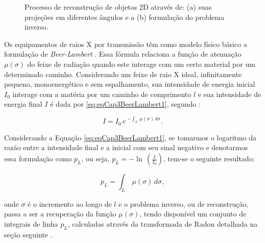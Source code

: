 
\begin{figure}[H]
	\centering
	
	\caption{Processo de reconstrução de objetos \acs{2D} através de: (a) suas projeções em diferentes ângulos e a (b) formulação do problema inverso.}
	
	\hfill
	
	\label{fig:imgCap3ProbInver}
\end{figure}

Os equipamentos de raios X por transmissão têm como modelo físico básico a formulação de \textit{Beer-Lambert} \cite{zeng2010medical}. Essa fórmula relaciona a função de atenuação $\mu(\sigma)$ do feixe de radiação quando este interage com um certo material por um determinado caminho. Considerando um feixe de raio X ideal, infinitamente pequeno, monoenergético e sem espalhamento, sua intensidade de energia inicial $I_{0}$ interage com a matéria por um caminho de comprimento $l$ e sua intensidade de energia final $I$ é dada por \eqref{eq:eqCap3BeerLambert1}, segundo :

\begin{equation}
 I = I_{0} \, e \, ^{-\int_{L}^{} \,\mu(\sigma) \, d\sigma}.
\label{eq:eqCap3BeerLambert1}
\end{equation}

Considerando a Equação \ref{eq:eqCap3BeerLambert1}, se tomarmos o logaritmo da razão entre a intensidade final e a inicial com seu sinal negativo e denotarmos essa formulação como $p_{L}$, ou seja, $p_{L} = -\ln \, \left(\frac{I}{I_{0}}\right)$, tem-se o seguinte resultado:

\begin{equation}
p_{L} = {\int_{L}^{} \,\mu(\sigma) \, d\sigma},
\label{eq:eqCap3BeerLambert2}
\end{equation}

\noindent onde $\sigma$ é o incremento ao longo de $l$ e o problema inverso, ou de reconstrução, passa a ser a recuperação da função  $\mu(\sigma)$, tendo disponível um conjunto de integrais de linha $p_{L}$, calculadas através da transformada de Radon detalhada na seção seguinte \cite[p. 33]{levakhina2014three}.  
 
